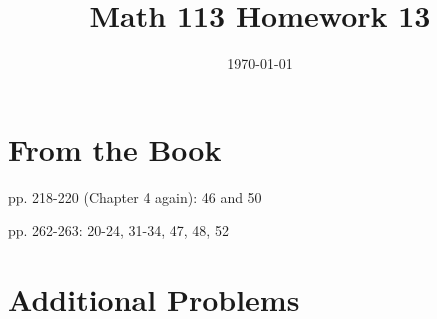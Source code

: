 \documentclass[fleqn,addpoints]{exam}
\title{Math 113 Homework 13}
\author{}
\date{\today}
\begin{document}
\maketitle

\section{From the Book}



\begin{itemize*}
  \item pp. 218-220 (Chapter 4 again): 46 and 50
  \item pp. 262-263: 20-24, 31-34, 47, 48, 52
\end{itemize*}


\section{Additional Problems}
\end{document}
